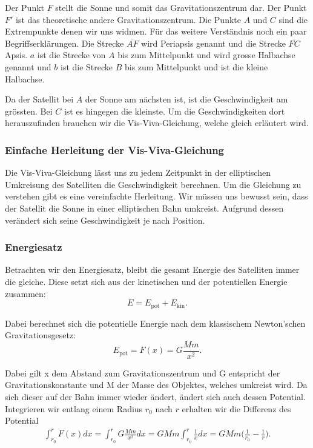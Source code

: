 \begin{refsection}
\noindent{}Der Punkt $F$ stellt die Sonne und somit das Gravitationszentrum dar. Der Punkt $F'$ ist das theoretische andere Gravitationszentrum. Die Punkte $A$ und $C$ sind die Extrempunkte denen wir uns widmen. Für das weitere Verständnis noch ein paar Begriffserklärungen. Die Strecke $\overline{AF}$ wird Periapsis genannt und die Strecke $\overline{FC}$ Apsis. $a$ ist die Strecke von $A$ bis zum Mittelpunkt und wird grosse Halbachse genannt und $b$ ist die Strecke $B$ bis zum Mittelpunkt und ist die kleine Halbachse.

Da der Satellit bei $A$ der Sonne am nächsten ist, ist die Geschwindigkeit am grössten. Bei $C$ ist es hingegen die kleinste. Um die Geschwindigkeiten dort herauszufinden brauchen wir die Vis-Viva-Gleichung, welche gleich erläutert wird.

\subsubsection{Einfache Herleitung der Vis-Viva-Gleichung}
Die Vis-Viva-Gleichung lässt uns zu jedem Zeitpunkt in der elliptischen Umkreisung des Satelliten die Geschwindigkeit berechnen. Um die Gleichung zu verstehen gibt es eine vereinfachte Herleitung. Wir müssen uns bewusst sein, dass der Satellit die Sonne in einer elliptischen Bahn umkreist. Aufgrund dessen verändert sich seine Geschwindigkeit je nach Position. 

\subsubsection{Energiesatz}
Betrachten wir den Energiesatz, bleibt die gesamt Energie des Satelliten immer die gleiche. Diese setzt sich aus der kinetischen und der potentiellen Energie zusammen:
\begin{equation}
E = E_{\text{pot}} + E_{\text{kin}}.
\end{equation}

\noindent{}Dabei berechnet sich die potentielle Energie nach dem klassischem Newton'schen Gravitationsgesetz:
\begin{equation}
E_{\text{pot}} = F(x) = G\frac{Mm}{x^2}.
\end{equation}

\noindent{}Dabei gilt x dem Abstand zum Gravitationszentrum und G entspricht der Gravitationskonstante und M der Masse des Objektes, welches umkreist wird. Da sich dieser auf der Bahn immer wieder ändert, ändert sich auch dessen Potential. Integrieren wir entlang einem Radius $r_0$ nach $r$ erhalten wir die Differenz des Potential
\begin{align*}
\int_{r_0}^{r} F(x) dx= \int_{r_0}^{r} G\frac{Mm}{x^2} dx = GMm \int_{r_0}^{r} \frac{1}{x} dx = GMm \biggr( \frac{1}{r_0} - \frac{1}{r}\biggr).
\end{align*}


\end{refsection}
